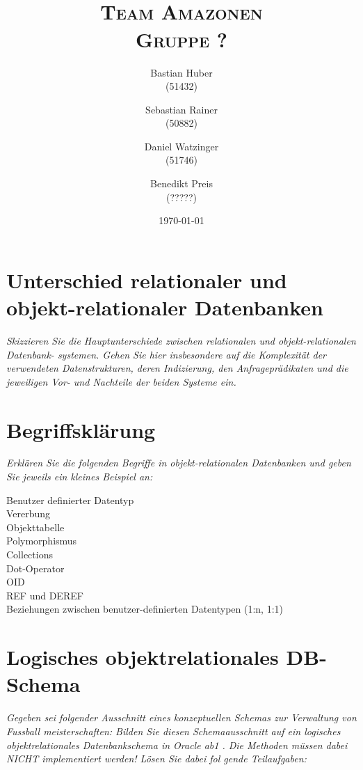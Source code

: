 \documentclass{article}
\author{Bastian Huber\\(51432) \and Sebastian Rainer\\(50882) \and Daniel Watzinger\\(51746) \and Benedikt Preis \\(?????)}
\title{\textbf{\huge{\thetitle}}\\\Large\textsc{Team Amazonen}\\\large\textsc{Gruppe ?}}
\date{\today}
\begin{document}
\hyphenation{}

\maketitle

\pagestyle{fancy}

\section{Unterschied relationaler und objekt-relationaler Datenbanken}
\textit{
Skizzieren Sie die Hauptunterschiede zwischen relationalen und objekt-relationalen Datenbank-
systemen. Gehen Sie hier insbesondere auf die Komplexität der verwendeten Datenstrukturen,
deren Indizierung, den Anfrageprädikaten und die jeweiligen Vor- und Nachteile der beiden
Systeme ein.}

\section{Begriffsklärung}
\textit{
Erklären Sie die folgenden Begriffe in objekt-relationalen Datenbanken und geben Sie jeweils
ein kleines Beispiel an:}
\begin{description}
	\item[Benutzer definierter Datentyp]
	\item[Vererbung]
	\item[Objekttabelle]
	\item[Polymorphismus]
	\item[Collections]
	\item[Dot-Operator]
	\item[OID]
	\item[REF und DEREF]
	\item[Beziehungen zwischen benutzer-definierten Datentypen (1:n, 1:1)]
\end{description}

\section{Logisches objektrelationales DB-Schema}
\textit{
Gegeben sei folgender Ausschnitt eines konzeptuellen Schemas zur Verwaltung von Fussball
meisterschaften:
Bilden Sie diesen Schemaausschnitt auf ein logisches objektrelationales Datenbankschema in
Oracle ab1 . Die Methoden müssen dabei NICHT implementiert werden! Lösen Sie dabei fol
gende Teilaufgaben:}
\end{document}

